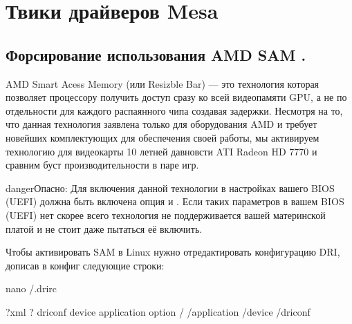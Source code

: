 \documentclass[letterpaper,10pt,russian,openany]{sphinxmanual}
\begin{document}
\section{Твики драйверов Mesa}
\label{\detokenize{source/generic-system-acceleration:id7}}
\ignorespaces 

\subsection{Форсирование использования AMD SAM .}
\label{\detokenize{source/generic-system-acceleration:amd-sam}}\label{\detokenize{source/generic-system-acceleration:force-amd-sam}}\label{\detokenize{source/generic-system-acceleration:index-12}}
\sphinxAtStartPar
AMD Smart Acess Memory (или Resizble Bar) — это технология которая позволяет процессору получить доступ сразу ко всей видеопамяти GPU,
а не по отдельности для каждого распаянного чипа создавая задержки. Несмотря на то,
что данная технология заявлена только для оборудования AMD и требует новейших комплектующих для обеспечения своей работы,
мы активируем технологию для видеокарты 10 летней давновсти ATI Radeon HD 7770 и сравним буст производительности в паре игр.

\begin{sphinxadmonition}{danger}{Опасно:}
\sphinxAtStartPar
Для включения данной технологии в настройках вашего BIOS (UEFI) должна быть включена опция  и .
Если таких параметров в вашем BIOS (UEFI) нет \sphinxhyphen{} скорее всего технология не поддерживается вашей материнской платой и не стоит даже пытаться её включить.
\end{sphinxadmonition}

\sphinxAtStartPar
Чтобы активировать SAM в Linux нужно отредактировать конфигурацию DRI, дописав в конфиг следующие строки:

\begin{sphinxVerbatim}[commandchars=\\\{\}]
nano \PYGZti{}/.drirc 


\PYGZlt{}?xml  ?\PYGZgt{}
\PYGZlt{}driconf\PYGZgt{}
  \PYGZlt{}device\PYGZgt{}
    \PYGZlt{}application \PYGZgt{}
      \PYGZlt{}option   /\PYGZgt{}
    \PYGZlt{}/application\PYGZgt{}
  \PYGZlt{}/device\PYGZgt{}
\PYGZlt{}/driconf\PYGZgt{}
\end{sphinxVerbatim}
\end{document}
